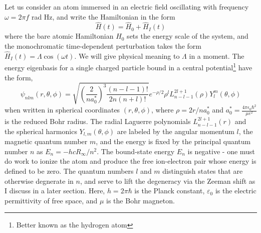 	Let us consider an atom immersed in an electric field oscillating with frequency $\omega = 2 \pi f$ rad Hz, and write the Hamiltonian in the form
	\begin{equation}
		\hat{H}(t) = \hat{H}_0 + \hat{H}_{I}(t)
	\end{equation}
	where the bare atomic Hamiltonian $H_0$ sets the energy scale of the system, and the monochromatic time-dependent perturbation takes the form $\hat{H}_I(t) = \Lambda \cos(\omega t)$. We will give physical meaning to $\Lambda$ in a moment. The energy eigenbasis for a single charged particle bound in a central potential\footnote{Better known as the hydrogen atom} have the form,
	\begin{equation}
	\psi_{nlm}(r,\theta,\phi) = 
	\sqrt{\left(\frac{2}{na_0 ^*}\right)^3\frac{(n-l-1)!}{2n(n+l)!}}e^{-\rho/2}\rho^l L_{n-l-1}^{2l+1}(\rho) Y^{m}_{l}(\theta,\phi)
	\end{equation}
	when written in spherical coordinates $(r,\theta,\phi)$, where $\rho = 2r/na_0 ^*$ and $a_0 ^* = \frac{4\pi\epsilon_0 \hbar^2}{\mu e^2}$ is the reduced Bohr radius.
	The radial Laguerre polynomials $L_{n-l-1}^{2l+1}(r)$ and the spherical harmonics $Y_{l,m}(\theta,\phi)$ are labeled by the angular momentum $l$, the magnetic quantum number $m$, and the energy is fixed by the principal quantum number $n$ as $E_n = -hcR_\infty/n^2$. The bound-state energy $E_n$ is negative - one must do work to ionize the atom and produce the free ion-electron pair whose energy is defined to be zero. The quantum numbers $l$ and $m$ distinguish states that are otherwise degnerate in $n$, and serve to lift the degeneracy via the Zeeman shift as I discuss in a later section. Here,  $h=2\pi\hbar$ is the Planck constant, $\varepsilon_0$ is the electric permittivity of free space, and $\mu$ is the Bohr magneton.
	
	

